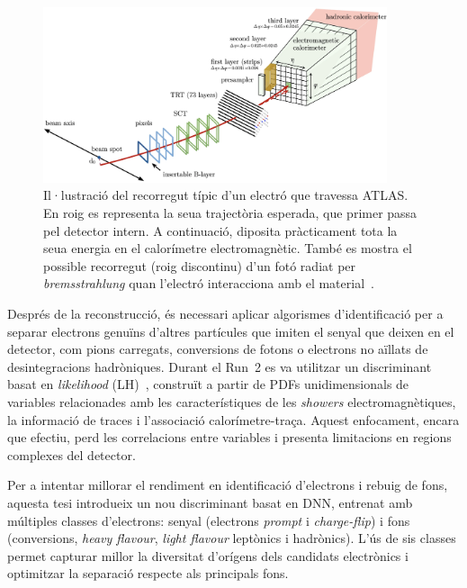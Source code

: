 \begin{figure}[htbp]
  \centering
  \includegraphics[width=0.9\textwidth]{images/electron_journey.png}
  \caption{Il·lustració del recorregut típic d’un electró que travessa ATLAS. En roig es representa la seua trajectòria esperada, que primer passa pel detector intern. A continuació, diposita pràcticament tota la seua energia en el calorímetre electromagnètic. També es mostra el possible recorregut (roig discontinu) d’un fotó radiat per \textit{bremsstrahlung} quan l’electró interacciona amb el material~\cite{Aaboud:2657964}.}
  \label{res:electron_journey}
\end{figure}

Després de la reconstrucció, és necessari aplicar algorismes d’identificació per a separar electrons genuïns d’altres partícules que imiten el senyal que deixen en el detector, com pions carregats, conversions de fotons o electrons no aïllats de desintegracions hadròniques.  
Durant el Run~2 es va utilitzar un discriminant basat en \textit{likelihood} (LH)~\cite{Aad:2684552,Aaboud:2657964}, construït a partir de PDFs unidimensionals de variables relacionades amb les característiques de les \textit{showers} electromagnètiques, la informació de traces i l’associació calorímetre-traça.  
Aquest enfocament, encara que efectiu, perd les correlacions entre variables i presenta limitacions en regions complexes del detector.  

Per a intentar millorar el rendiment en identificació d’electrons i rebuig de fons, aquesta tesi introdueix un nou discriminant basat en DNN, entrenat amb múltiples classes d’electrons: senyal (electrons \textit{prompt} i \textit{charge-flip}) i fons (conversions, \textit{heavy flavour}, \textit{light flavour} leptònics i hadrònics).  
L’ús de sis classes permet capturar millor la diversitat d’orígens dels candidats electrònics i optimitzar la separació respecte als principals fons.

